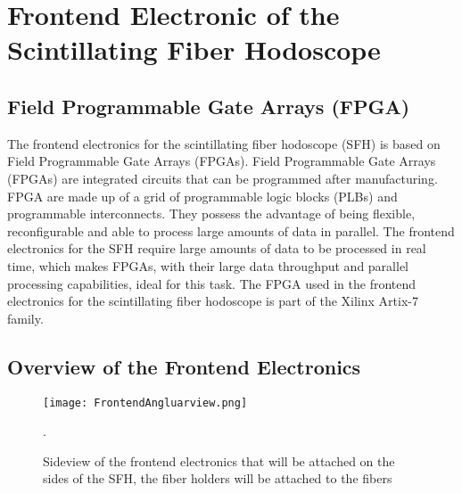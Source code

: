 \chapter{Frontend Electronic of the Scintillating Fiber Hodoscope}\label{cha:frontend}

\noindent
\section{Field Programmable Gate Arrays (FPGA)}\label{sec:FPGA}
The frontend electronics for the scintillating fiber hodoscope (SFH) is based on Field Programmable Gate Arrays (FPGAs).
Field Programmable Gate Arrays (FPGAs) are integrated circuits that can be programmed after manufacturing.
FPGA are made up of a grid of programmable logic blocks (PLBs) and programmable interconnects.
They possess the advantage of being flexible, reconfigurable and able to process large amounts of data in parallel.
The frontend electronics for the SFH require large amounts of data to be processed in real time, which makes FPGAs, with their large data throughput and parallel processing capabilities, ideal for this task\autocite{FPGA_reviewDSP}.
\newline
The FPGA used in the frontend electronics for the scintillating fiber hodoscope is part of the Xilinx Artix-7 family\autocite{InternalcommunicationIgor}.
\section{Overview of the Frontend Electronics}
\begin{figure}[h]
    \centering
    \texttt{[image: FrontendAngluarview.png]}
    \caption{Sideview of the frontend electronics that will be attached on the sides of the SFH, the fiber holders will be attached to the fibers\autocite{InternalcommunicationKarl} }.
    \label{fig:SideviewModelElectronics}
    \end{figure}
